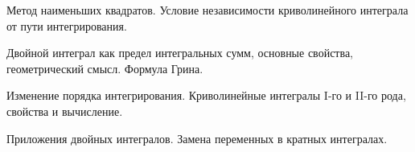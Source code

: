\documentclass[
	14pt,
	a4paper,
	]
	{scrartcl}
\begin{document}
\vfill
\z Метод наименьших квадратов.
 \vfill
\z Условие независимости криволинейного интеграла от пути интегрирования.
 \vfill

\vfill

\newpage


\shapk
{}
\setcounter{zad}{0}

\vfill
\z Двойной интеграл как предел интегральных сумм, основные свойства, геометрический смысл.
 \vfill
\z Формула Грина.
 \vfill

\vfill

\newpage


\shapk
{}
\setcounter{zad}{0}

\vfill
\z Изменение порядка интегрирования.
 \vfill
\z Криволинейные интегралы I-го и II-го рода, свойства и вычисление.
 \vfill

\vfill

\newpage


\shapk
{}
\setcounter{zad}{0}

\vfill
\z Приложения двойных интегралов.
 \vfill
\z Замена переменных в кратных интегралах.
 \vfill

\vfill

\newpage
\end{document}

